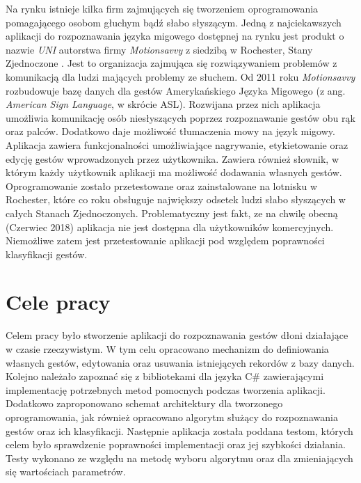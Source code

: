 Na rynku istnieje kilka firm zajmujących się tworzeniem oprogramowania pomagającego osobom głuchym bądź słabo słyszącym. Jedną z najciekawszych aplikacji do rozpoznawania języka migowego dostępnej na rynku jest produkt o nazwie \textit{UNI} autorstwa firmy \textit{Motionsavvy} z siedzibą w Rochester, Stany Zjednoczone \cite{Uni}. Jest to organizacja zajmująca się rozwiązywaniem problemów z komunikacją dla ludzi mających problemy ze słuchem. Od 2011 roku \textit{Motionsavvy} rozbudowuje bazę danych dla gestów Amerykańskiego Języka Migowego (z ang. \textit{American Sign Language}, w skrócie ASL). Rozwijana przez nich aplikacja umożliwia komunikację osób niesłyszących poprzez rozpoznawanie gestów obu rąk oraz palców. Dodatkowo daje możliwość tłumaczenia mowy na język migowy. Aplikacja zawiera funkcjonalności umożliwiające nagrywanie, etykietowanie oraz edycję gestów wprowadzonych przez użytkownika. Zawiera również słownik, w którym każdy użytkownik aplikacji ma możliwość dodawania własnych gestów. Oprogramowanie zostało przetestowane oraz zainstalowane na lotnisku w Rochester, które co roku obsługuje największy odsetek ludzi słabo słyszących w całych Stanach Zjednoczonych. Problematyczny jest fakt, ze na chwilę obecną (Czerwiec 2018) aplikacja nie jest dostępna dla użytkowników komercyjnych. Niemożliwe zatem jest przetestowanie aplikacji pod względem poprawności klasyfikacji gestów.

\section{Cele pracy}
\label{sec:celePracy}
Celem pracy było stworzenie aplikacji do rozpoznawania gestów dłoni działające w czasie rzeczywistym. W tym celu opracowano mechanizm do definiowania własnych gestów, edytowania oraz usuwania istniejących rekordów z bazy danych. Kolejno należało zapoznać się z bibliotekami dla języka C\# zawierającymi implementację potrzebnych metod pomocnych podczas tworzenia aplikacji. Dodatkowo zaproponowano schemat architektury dla tworzonego oprogramowania, jak również opracowano algorytm służący do rozpoznawania gestów oraz ich klasyfikacji. Następnie aplikacja została poddana testom, których celem było sprawdzenie poprawności implementacji oraz jej szybkości działania. Testy wykonano ze względu na metodę wyboru algorytmu oraz dla zmieniających się wartościach parametrów.


